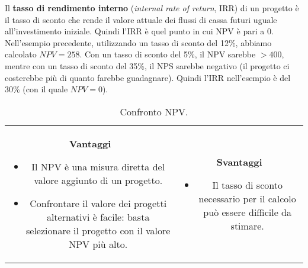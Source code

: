 \documentclass[a4paper,portrait,12pt]{article}
\theoremstyle{definition}
\begin{document}
Il \textbf{tasso di rendimento interno} (\emph{internal rate of return}, IRR) di un progetto è il tasso di sconto che rende il valore attuale dei flussi di cassa futuri uguale all'investimento iniziale.
Quindi l'IRR è quel punto in cui NPV è pari a 0.\\

Nell'esempio precedente, utilizzando un tasso di sconto del 12\%, abbiamo calcolato $NPV = 258$.
Con un tasso di sconto del 5\%, il NPV sarebbe $> 400$, mentre con un tasso di sconto del 35\%, il NPS sarebbe negativo (il progetto ci costerebbe più di quanto farebbe guadagnare).
Quindi l'IRR nell'esempio è del 30\% (con il quale $NPV = 0$).

\begin{table}[h]
\begin{tabular}{cc}
\begin{minipage}[t]{.5\linewidth}
\textbf{Vantaggi}
\begin{itemize}
\item Il NPV è una misura diretta del valore aggiunto di un progetto.
\item Confrontare il valore dei progetti alternativi è facile: basta selezionare il progetto con il valore NPV più alto.
\end{itemize}
\end{minipage}
&
\begin{minipage}[t]{.5\linewidth}
\textbf{Svantaggi}
\begin{itemize}
\item Il tasso di sconto necessario per il calcolo può essere difficile da stimare.
\end{itemize}
\end{minipage}
\end{tabular}
\caption{Confronto NPV.}
\end{table}
\end{document}
